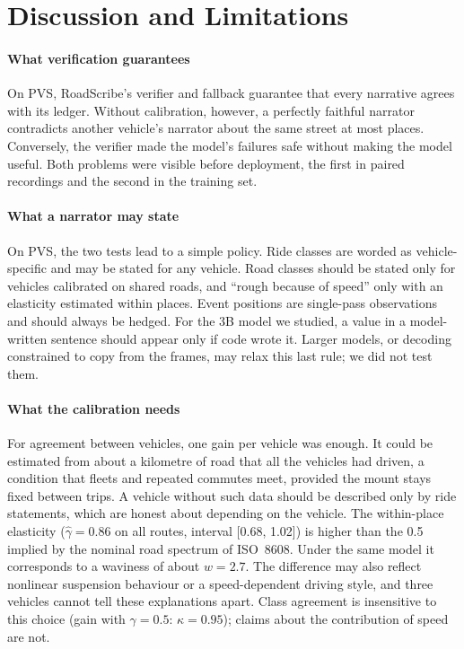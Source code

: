 \section{Discussion and Limitations}
\label{sec:discussion}

\paragraph*{What verification guarantees}
On PVS, RoadScribe's verifier and fallback guarantee that every narrative agrees with its ledger.
Without calibration, however, a perfectly faithful narrator contradicts another vehicle's narrator about the same street at most places.
Conversely, the verifier made the model's failures safe without making the model useful.
Both problems were visible before deployment, the first in paired recordings and the second in the training set.

\paragraph*{What a narrator may state}
On PVS, the two tests lead to a simple policy.
Ride classes are worded as vehicle-specific and may be stated for any vehicle. Road classes should be stated only for vehicles calibrated on shared roads, and ``rough because of speed'' only with an elasticity estimated within places.
Event positions are single-pass observations and should always be hedged.
For the 3B model we studied, a value in a model-written sentence should appear only if code wrote it. Larger models, or decoding constrained to copy from the frames, may relax this last rule; we did not test them.

\paragraph*{What the calibration needs}
For agreement between vehicles, one gain per vehicle was enough. It could be estimated from about a kilometre of road that all the vehicles had driven, a condition that fleets and repeated commutes meet, provided the mount stays fixed between trips.
A vehicle without such data should be described only by ride statements, which are honest about depending on the vehicle.
The within-place elasticity ($\hat\gamma=0.86$ on all routes, interval [0.68, 1.02]) is higher than the 0.5 implied by the nominal road spectrum of ISO~8608. Under the same model it corresponds to a waviness of about $w=2.7$.
The difference may also reflect nonlinear suspension behaviour or a speed-dependent driving style, and three vehicles cannot tell these explanations apart.
Class agreement is insensitive to this choice (gain with $\gamma=0.5$: $\kappa=0.95$); claims about the contribution of speed are not.

